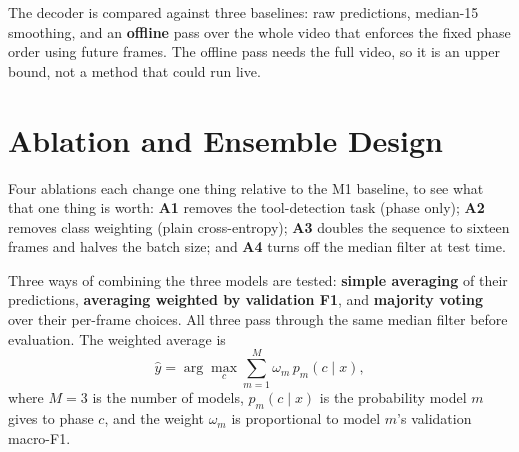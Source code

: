 The decoder is compared against three baselines: raw predictions, median-15 smoothing, and an \textbf{offline} pass over the whole video that enforces the fixed phase order using future frames. The offline pass needs the full video, so it is an upper bound, not a method that could run live.

\section{Ablation and Ensemble Design}

Four ablations each change one thing relative to the M1 baseline, to see what that one thing is worth: \textbf{A1} removes the tool-detection task (phase only); \textbf{A2} removes class weighting (plain cross-entropy); \textbf{A3} doubles the sequence to sixteen frames and halves the batch size; and \textbf{A4} turns off the median filter at test time.

Three ways of combining the three models are tested: \textbf{simple averaging} of their predictions, \textbf{averaging weighted by validation F1}, and \textbf{majority voting} over their per-frame choices. All three pass through the same median filter before evaluation. The weighted average is
\begin{equation}
\hat{y} = \arg\max_c \sum_{m=1}^{M} \omega_m \, p_m(c \mid x),
\label{eq:ensemble}
\end{equation}
where $M = 3$ is the number of models, $p_m(c \mid x)$ is the probability model $m$ gives to phase $c$, and the weight $\omega_m$ is proportional to model $m$'s validation macro-F1.
